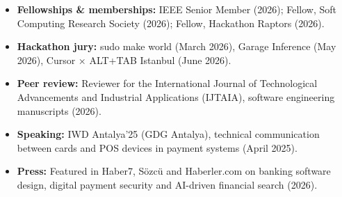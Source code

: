 \begin{itemize}
  \item \textbf{Fellowships \& memberships:} IEEE Senior Member (2026); Fellow, Soft Computing Research Society (2026); Fellow, Hackathon Raptors (2026).
  \item \textbf{Hackathon jury:} sudo make world (March 2026), Garage Inference (May 2026), Cursor × ALT+TAB Istanbul (June 2026).
  \item \textbf{Peer review:} Reviewer for the International Journal of Technological Advancements and Industrial Applications (IJTAIA), software engineering manuscripts (2026).
  \item \textbf{Speaking:} IWD Antalya'25 (GDG Antalya), technical communication between cards and POS devices in payment systems (April 2025).
  \item \textbf{Press:} Featured in Haber7, Sözcü and Haberler.com on banking software design, digital payment security and AI-driven financial search (2026).
\end{itemize}
